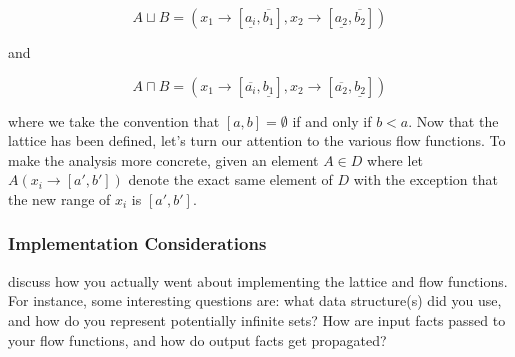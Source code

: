 \documentclass{article}
\theoremstyle{definition}
\begin{document}
\[ A \sqcup B = (x_1 \rightarrow [\underline{a_i}, \overline{b_1} ], x_2 \rightarrow [\underline{a_2}, \overline{b_2} ] )\]

\noindent and

\[ A \sqcap B = (x_1 \rightarrow [\overline{a_i}, \underline{b_1} ], x_2 \rightarrow [\overline{a_2}, \underline{b_2} ] )\]

\noindent where we take the convention that $[a, b] = \emptyset$ if and only if $b < a$. Now that the lattice has been defined, let's turn our attention to the various flow functions. To make the analysis more concrete, given an element $A \in D$ where let $A(x_i \rightarrow [a', b'])$ denote the exact same element of $D$ with the exception that the new range of $x_i$ is $[a', b']$.



\subsubsection{Implementation Considerations}
\begin{framed}
  discuss how you actually went about implementing the lattice and
  flow functions. For instance, some interesting questions are: what
  data structure(s) did you use, and how do you represent potentially
  infinite sets? How are input facts passed to your flow functions,
  and how do output facts get propagated?
\end{framed}
\end{document}
